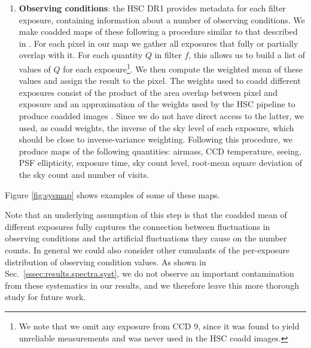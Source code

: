 \documentclass[a4paper,11pt]{article}
\begin{document}
\begin{enumerate}
      \item {\bf Observing conditions}: the HSC DR1 provides metadata for each filter exposure, containing information about a number of observing conditions. We make coadded maps of these following a procedure similar to that described in \cite{2016ApJS..226...24L}. For each pixel in our map we gather all exposures that fully or partially overlap with it. For each quantity $Q$ in filter $f$, this allows us to build a list of values of $Q$ for each exposure\footnote{We note that we omit any exposure from CCD 9, since it was found to yield unreliable measurements and was never used in the HSC coadd images.}. We then compute the weighted mean of these values and assign the result to the pixel. The weights used to coadd different exposures consist of the product of the area overlap between pixel and exposure and an approximation of the weights used by the HSC pipeline to produce coadded images \cite{2018PASJ...70S...5B}. Since we do not have direct access to the latter, we used, as coadd weights, the inverse of the sky level of each exposure, which should be close to inverse-variance weighting. Following this procedure, we produce maps of the following quantities: airmass, CCD temperature, seeing, PSF ellipticity, exposure time, sky count level, root-mean square deviation of the sky count and number of visits.
    \end{enumerate}
    Figure \ref{fig:sysmap} shows examples of some of these maps.
    
    Note that an underlying assumption of this step is that the coadded mean of different exposures fully captures the connection between fluctuations in observing conditions and the artificial fluctuations they cause on the number counts. In general we could also consider other cumulants of the per-exposure distribution of observing condition values. As shown in Sec.~\ref{sssec:results.spectra.syst}, we do not observe an important contamination from these systematics in our results, and we therefore leave this more thorough study for future work.
\end{document}
